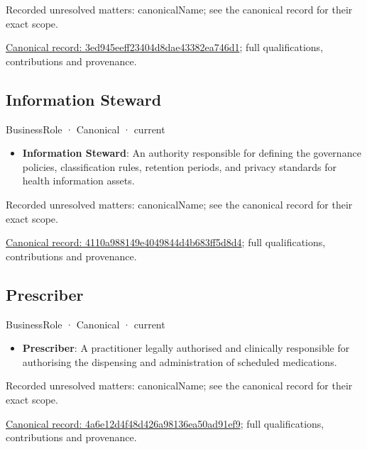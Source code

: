 {\small Recorded unresolved matters: canonicalName; see the canonical record for their exact scope.}\par
{\footnotesize \href{../../../../continuum/business/business-role/3ed945eeff23404d8dae43382ea746d1.md}{Canonical record: 3ed945eeff23404d8dae43382ea746d1}; full qualifications, contributions and provenance.}\par
\subsection{Information Steward}

\label{element:4110a988149e4049844d4b683ff5d8d4}
{\small BusinessRole · Canonical · current}\par

\begin{itemize}


\item \textbf{Information Steward}: An authority responsible for defining the governance policies, classification rules, retention periods, and privacy standards for health information assets.

\end{itemize}

{\small Recorded unresolved matters: canonicalName; see the canonical record for their exact scope.}\par
{\footnotesize \href{../../../../continuum/business/business-role/4110a988149e4049844d4b683ff5d8d4.md}{Canonical record: 4110a988149e4049844d4b683ff5d8d4}; full qualifications, contributions and provenance.}\par
\subsection{Prescriber}

\label{element:4a6e12d4f48d426a98136ea50ad91ef9}
{\small BusinessRole · Canonical · current}\par

\begin{itemize}


\item \textbf{Prescriber}: A practitioner legally authorised and clinically responsible for authorising the dispensing and administration of scheduled medications.

\end{itemize}

{\small Recorded unresolved matters: canonicalName; see the canonical record for their exact scope.}\par
{\footnotesize \href{../../../../continuum/business/business-role/4a6e12d4f48d426a98136ea50ad91ef9.md}{Canonical record: 4a6e12d4f48d426a98136ea50ad91ef9}; full qualifications, contributions and provenance.}\par
